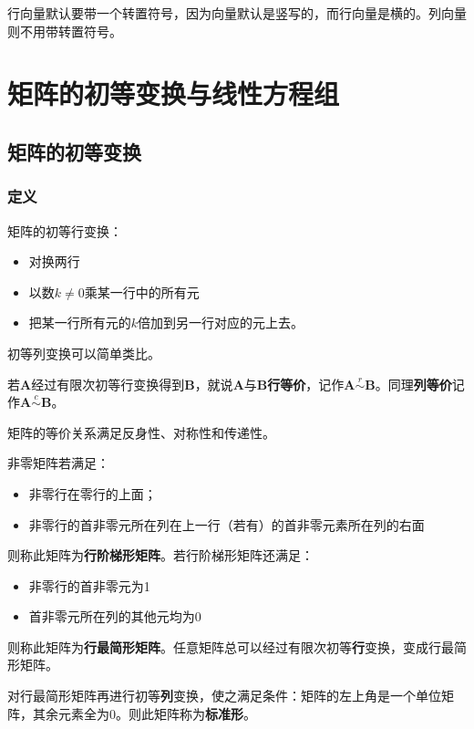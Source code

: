 \documentclass[12pt, a4paper, oneside]{ctexart}
\begin{document}
行向量默认要带一个转置符号，因为向量默认是竖写的，而行向量是横的。列向量则不用带转置符号。

\section{矩阵的初等变换与线性方程组}

\subsection{矩阵的初等变换}

\subsubsection{定义}

矩阵的初等行变换：
\begin{itemize}
  \item 对换两行
  \item 以数$k\neq 0$乘某一行中的所有元
  \item 把某一行所有元的$k$倍加到另一行对应的元上去。
\end{itemize}

初等列变换可以简单类比。

若$\mathbf{A}$经过有限次初等行变换得到$\mathbf{B}$，就说$\mathbf{A}$与$\mathbf{B}$\textbf{行等价}，记作$\mathbf{A}\overset{r}{\sim}\mathbf{B}$。同理\textbf{列等价}记作$\mathbf{A}\overset{c}{\sim}\mathbf{B}$。

矩阵的等价关系满足反身性、对称性和传递性。

非零矩阵若满足：
\begin{itemize}
  \item 非零行在零行的上面；
  \item 非零行的首非零元所在列在上一行（若有）的首非零元素所在列的右面
\end{itemize}

则称此矩阵为\textbf{行阶梯形矩阵}。若行阶梯形矩阵还满足：
\begin{itemize}
  \item 非零行的首非零元为1
  \item 首非零元所在列的其他元均为0
\end{itemize}

则称此矩阵为\textbf{行最简形矩阵}。任意矩阵总可以经过有限次初等\textbf{行}变换，变成行最简形矩阵。

对行最简形矩阵再进行初等\textbf{列}变换，使之满足条件：矩阵的左上角是一个单位矩阵，其余元素全为0。则此矩阵称为\textbf{标准形}。
\end{document}
